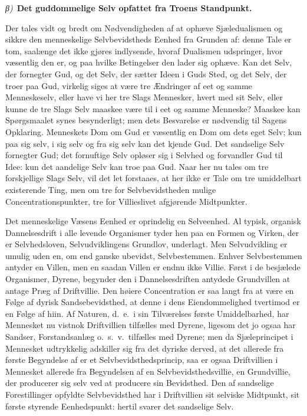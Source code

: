 \documentclass[12pt]{book}
\newcommand{\greekrun}[2]{%
  \medskip\begin{center}{\itshape #1)}\ {\bfseries #2}\end{center}\medskip}
\begin{document}
\greekrun{β}{Det guddommelige Selv opfattet fra Troens Standpunkt.}

Der tales vidt og bredt om Nødvendigheden af at ophæve
Sjæledualismen og sikkre den menneskelige Selvbevidstheds Eenhed fra
Grunden af: denne Tale er tom, saalænge det ikke gjøres indlysende,
hvoraf Dualismen udspringer, hvor væsentlig den er, og paa hvilke
Betingelser den lader sig ophæve. Kan det Selv, der fornegter Gud,
og det Selv, der sætter Ideen i Guds Sted, og det Selv, der troer
paa Gud, virkelig siges at være tre Ændringer af eet og samme
Menneskeselv, eller have vi her tre Slags Mennesker, hvert med sit
Selv, eller kunne de tre Slags Selv maaskee være til i eet og samme
Menneske? Maaskee kan Spørgsmaalet synes besynderligt; men dets
Besvarelse er nødvendig til Sagens Opklaring. Menneskets Dom om Gud
er væsentlig en Dom om dets eget Selv; kun paa sig selv, i sig selv
og fra sig selv kan det kjende Gud. Det sandselige Selv fornegter
Gud; det
fornuftige Selv opløser sig i Selvhed og forvandler Gud til Idee:
kun det aandelige Selv kan troe paa Gud. Naar her nu tales om tre
forskjellige Slags Selv, vil det let forstaaes, at her ikke er Tale
om tre umiddelbart existerende Ting, men om tre for
Selvbevidstheden mulige Concentrationspunkter, tre for Villieslivet
afgjørende Midtpunkter.

Det menneskelige Væsens Eenhed er oprindelig en Selveenhed. Al
typisk, organisk Dannelsesdrift i alle levende Organismer tyder hen
paa en Formen og Virken, der er Selvhedsloven,
Selvudviklingens Grundlov, underlagt. Men Selvudvikling er umulig
uden en, om end ganske ubevidst, Selvbestemmen. Enhver
Selvbestemmen antyder en Villen, men en saadan Villen er endnu ikke
Villie. Først i de besjælede Organismer, Dyrene, begynder den i
Dannelsesdriften antydede Grundvillen at antage Præg af
Driftvillie. Den høiere Concentration er saa langt fra at være en
Følge af dyrisk Sandsebevidsthed, at denne i dens Eiendommelighed
tvertimod er en Følge af hiin. Af Naturen, d.\ e.\ i sin
Tilværelses første Umiddelbarhed, har Mennesket nu vistnok
Driftvillien tilfælles med Dyrene, ligesom det jo ogsaa har Sandser,
Forstandsanlæg o.\ s.\ v.\ tilfælles med Dyrene; men da
Sjæleprincipet i Mennesket udtrykkelig adskiller sig fra det dyriske
derved, at det allerede fra første Begyndelse af er et
Selvbevidsthedsprincip, saa er ogsaa Driftvillien i Mennesket
allerede fra Begyndelsen af en Selvbevidsthedsvillie, en
Grundvillie, der producerer sig selv ved at producere sin
Bevidsthed. Den af sandselige Forestillinger opfyldte
Selvbevidsthed har i Driftvillien sit selviske Midtpunkt, sit første
styrende Eenhedspunkt: hertil svarer det sandselige Selv.
\end{document}
